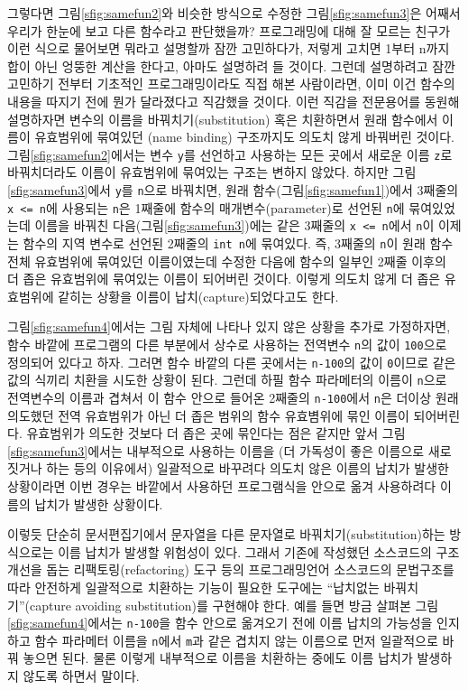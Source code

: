 그렇다면 그림\;\ref{sfig:samefun2}와 비슷한 방식으로 수정한 
그림\;\ref{sfig:samefun3}은 어째서 우리가 한눈에 보고 다른 함수라고 판단했을까?
프로그래밍에 대해 잘 모르는 친구가 이런 식으로 물어보면 뭐라고 설명할까
잠깐 고민하다가, 저렇게 고치면 1부터 n까지 합이 아닌 엉뚱한 계산을 한다고,
아마도 설명하려 들 것이다. 그런데 설명하려고 잠깐 고민하기 전부터
기초적인 프로그래밍이라도 직접 해본 사람이라면, 이미 이건 함수의 내용을
따지기 전에 뭔가 달라졌다고 직감했을 것이다. 이런 직감을 전문용어를
동원해 설명하자면 변수의 이름을 바꿔치기(substitution) 혹은 치환하면서
원래 함수에서 이름이 유효범위에 묶여있던 (name binding) 구조까지도 의도치
않게 바꿔버린 것이다. 그림\;\ref{sfig:samefun2}에서는 변수 \texttt{y}를 선언하고
사용하는 모든 곳에서 새로운 이름 \texttt{z}로 바꿔치더라도 이름이 유효범위에
묶여있는 구조는 변하지 않았다. 하지만 그림\;\ref{sfig:samefun3}에서 \texttt{y}를
\texttt{n}으로 바꿔치면, 원래 함수(그림\;\ref{sfig:samefun1})에서 3째줄의
\texttt{x\,<=\,n}에 사용되는 \texttt{n}은 1째줄에 함수의 매개변수(parameter)로
선언된 \texttt{n}에 묶여있었는데 이름을 바꿔친 다음(그림\;\ref{sfig:samefun3})에는
같은 3째줄의 \texttt{x\,<=\,n}에서 \texttt{n}이 이제는 함수의 지역 변수로 선언된
2째줄의 \texttt{int n}에 묶여있다. 즉, 3째줄의 \texttt{n}이 원래 함수 전체
유효범위에 묶여있던 이름이였는데 수정한 다음에 함수의 일부인 2째줄 이후의
더 좁은 유효범위에 묶여있는 이름이 되어버린 것이다. 이렇게 의도치 않게
더 좁은 유효범위에 같히는 상황을 이름이 납치(capture)되었다고도 한다.

그림\;\ref{sfig:samefun4}에서는 그림 자체에 나타나 있지 않은 상황을 추가로
가정하자면, 함수 바깥에 프로그램의 다른 부분에서 상수로 사용하는 전역변수
\texttt{n}의 값이 \texttt{100}으로 정의되어 있다고 하자. 그러면 함수 바깥의
다른 곳에서는 \texttt{n-100}의 값이 \texttt{0}이므로 같은 값의 식끼리 치환을
시도한 상황이 된다. 그런데 하필 함수 파라메터의 이름이 \texttt{n}으로 전역변수의
이름과 겹쳐서 이 함수 안으로 들어온 2째줄의 \texttt{n-100}에서 \texttt{n}은
더이상 원래 의도했던 전역 유효범위가 아닌 더 좁은 범위의 함수 유효볌위에 묶인
이름이 되어버린다. 유효범위가 의도한 것보다 더 좁은 곳에 묶인다는 점은 같지만
앞서 그림\;\ref{sfig:samefun3}에서는 내부적으로 사용하는 이름을 (더 가독성이
좋은 이름으로 새로 짓거나 하는 등의 이유에서) 일괄적으로 바꾸려다 의도치 않은
이름의 납치가 발생한 상황이라면 이번 경우는 바깥에서 사용하던 프로그램식을
안으로 옮겨 사용하려다 이름의 납치가 발생한 상황이다.

이렇듯 단순히 문서편집기에서 문자열을 다른 문자열로 바꿔치기(substitution)하는
방식으로는 이름 납치가 발생할 위험성이 있다. 그래서 기존에 작성했던 소스코드의
구조개선을 돕는 리팩토링(refactoring) 도구 등의 프로그래밍언어 소스코드의
문법구조를 따라 안전하게 일괄적으로 치환하는 기능이 필요한 도구에는
``납치없는 바꿔치기''(capture avoiding substitution)를 구현해야
한다. 예를 들면 방금 살펴본 그림\;\ref{sfig:samefun4}에서는 \texttt{n-100}을
함수 안으로 옮겨오기 전에 이름 납치의 가능성을 인지하고 함수 파라메터 이름을
\texttt{n}에서 \texttt{m}과 같은 겹치지 않는 이름으로 먼저 일괄적으로 바꿔
놓으면 된다. 물론 이렇게 내부적으로 이름을 치환하는 중에도 이름 납치가 발생하지
않도록 하면서 말이다.

